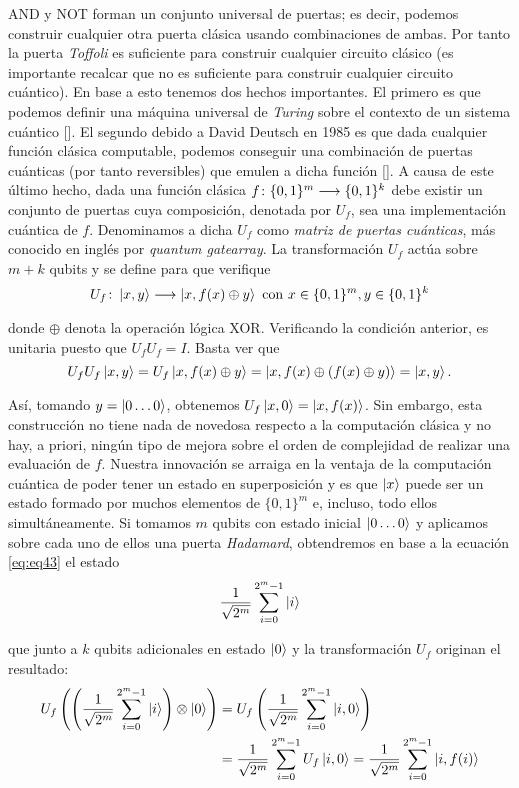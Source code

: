 AND y NOT forman un conjunto universal de puertas; es decir, podemos construir cualquier otra puerta clásica usando combinaciones de ambas. Por tanto la puerta \textit{Toffoli} es suficiente para construir cualquier circuito clásico (es importante recalcar que no es suficiente para construir cualquier circuito cuántico). En base a esto tenemos dos hechos importantes. El primero es que podemos definir una máquina universal de \textit{Turing} sobre el contexto de un sistema cuántico [\cite{bernstein1997quantum}]. El segundo debido a David Deutsch en 1985 es que dada cualquier función clásica computable, podemos conseguir una combinación de puertas cuánticas (por tanto reversibles) que emulen a dicha función [\cite{deutsch1985quantum}]. A causa de este último hecho, dada una función clásica $f\colon \{0,1\}^m\longrightarrow \{0,1\}^k$ debe existir un conjunto de puertas cuya composición, denotada por $U_f$, sea una implementación cuántica de $f$. Denominamos a dicha $U_f$ como \textit{matriz de puertas cuánticas}, más conocido en inglés por \textit{quantum gatearray}. La transformación $U_f$ actúa sobre $m+k$ qubits y se define para que verifique
\[U_f\colon \left|x,y\right\rangle\longrightarrow \left|x,f(x)\oplus y\right\rangle\mathrm{\ con\ }x\in\{0,1\}^m,y\in\{0,1\}^k\]

donde $\oplus$ denota la operación lógica XOR. Verificando la condición anterior, es unitaria puesto que $U_fU_f=I$. Basta ver que
\[U_fU_f\left|x,y\right\rangle=U_f\left|x,f(x)\oplus y\right\rangle=\left|x,f(x)\oplus(f(x)\oplus y)\right\rangle=\left|x,y\right\rangle.
\]

Así, tomando $y=\left|0\hdots0\right\rangle$, obtenemos $U_f\left|x,0\right\rangle=\left|x,f(x)\right\rangle$. Sin embargo, esta construcción no tiene nada de novedosa respecto a la computación clásica y no hay, a priori, ningún tipo de mejora sobre el orden de complejidad de realizar una evaluación de $f$. Nuestra innovación se arraiga en la ventaja de la computación cuántica de poder tener un estado en superposición y es que $\left|x\right\rangle$ puede ser un estado formado por muchos elementos de $\{0,1\}^m$ e, incluso, todo ellos simultáneamente. Si tomamos $m$ qubits con estado inicial $\left|0\hdots0\right\rangle$ y aplicamos sobre cada uno de ellos una puerta \textit{Hadamard}, obtendremos en base a la ecuación \ref{eq:eq43} el estado
\[\dfrac{1}{\sqrt{2^m}}\sum_{i=0}^{2^m-1}\left|i\right\rangle\]

que junto a $k$ qubits adicionales en estado $\left|0\right\rangle$ y la transformación $U_f$ originan el resultado:
\[\begin{split}
U_f\left(\left(\dfrac{1}{\sqrt{2^m}}\sum_{i=0}^{2^m-1}\left|i\right\rangle\right)\otimes\left|0\right\rangle\right)&=U_f\left(\dfrac{1}{\sqrt{2^m}}\sum_{i=0}^{2^m-1}\left|i,0\right\rangle\right)\\&=\dfrac{1}{\sqrt{2^m}}\sum_{i=0}^{2^m-1}U_f\left|i,0\right\rangle=\dfrac{1}{\sqrt{2^m}}\sum_{i=0}^{2^m-1}\left|i,f(i)\right\rangle
\end{split}\]

